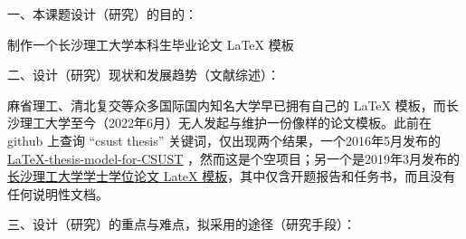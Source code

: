 \documentclass{csustThesis}
\begin{document}
\makeResearchProposalCover

\pagestyle{empty}  %

\begin{ubox}[breakable,]
\noindent 一、本课题设计（研究）的目的：

制作一个长沙理工大学本科生毕业论文 \LaTeX{} 模板

\vspace*{14\baselineskip}

\end{ubox}

\vspace{-.4\baselineskip}

\begin{ubox}
\noindent 二、设计（研究）现状和发展趋势（文献综述）：

麻省理工、清北复交等众多国际国内知名大学早已拥有自己的 \LaTeX{} 模板，而长沙理工大学至今（2022年6月）无人发起与维护一份像样的论文模板。此前在 github 上查询 “csust thesis” 关键词，仅出现两个结果，一个2016年5月发布的 \href{https://github.com/zonkisa/LaTeX-thesis-model-for-CSUST}{LaTeX-thesis-model-for-CSUST} ，然而这是个空项目；另一个是2019年3月发布的\href{https://github.com/leoppro/csust_thesis_latex}{长沙理工大学学士学位论文 LateX 模板}，其中仅含开题报告和任务书，而且没有任何说明性文档。

\vspace*{4\baselineskip}


\end{ubox}

\vspace{-.4\baselineskip}

\begin{ubox}[breakable,]
\noindent 三、设计（研究）的重点与难点，拟采用的途径（研究手段）：

\vspace*{8\baselineskip}

\end{ubox}

\vspace{-\baselineskip}
\end{document}

